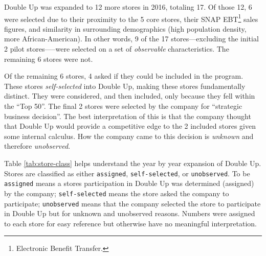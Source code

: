 \documentclass[12pt,letterpaperpaper,]{book}
\begin{document}
Double Up was expanded to 12 more stores in 2016, totaling 17. Of those
12, 6 were selected due to their proximity to the 5 core stores, their
SNAP EBT\footnote{Electronic Benefit Transfer.} sales figures, and
similarity in surrounding demographics (high population density, more
African-American). In other words, 9 of the 17 stores---excluding the
initial 2 pilot stores-----were selected on a set of \emph{observable}
characteristics. The remaining 6 stores were not.

Of the remaining 6 stores, 4 asked if they could be included in the
program. These stores \emph{self-selected} into Double Up, making these
stores fundamentally distinct. They were considered, and then included,
only because they fell within the ``Top 50''. The final 2 stores were
selected by the company for ``strategic business decision''. The best
interpretation of this is that the company thought that Double Up would
provide a competitive edge to the 2 included stores given some internal
calculus. How the company came to this decision is \emph{unknown} and
therefore \emph{unobserved}.

Table \ref{tab:store-class} helps understand the year by year expansion
of Double Up. Stores are classified as either \texttt{assigned},
\texttt{self-selected}, or \texttt{unobserved}. To be \texttt{assigned}
means a stores participation in Double Up was determined (assigned) by
the company; \texttt{self-selected} means the store asked the company to
participate; \texttt{unobserved} means that the company selected the
store to participate in Double Up but for unknown and unobserved
reasons. Numbers were assigned to each store for easy reference but
otherwise have no meaningful interpretation.
\end{document}
